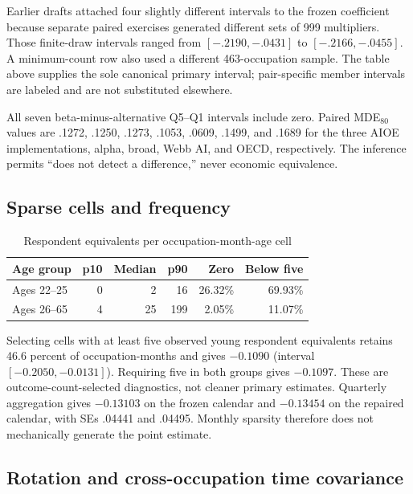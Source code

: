 Earlier drafts attached four slightly different intervals to the frozen coefficient because separate paired exercises generated different sets of 999 multipliers. Those finite-draw intervals ranged from $[-.2190,-.0431]$ to $[-.2166,-.0455]$. A minimum-count row also used a different 463-occupation sample. The table above supplies the sole canonical primary interval; pair-specific member intervals are labeled and are not substituted elsewhere.

All seven beta-minus-alternative Q5--Q1 intervals include zero. Paired MDE$_{80}$ values are .1272, .1250, .1273, .1053, .0609, .1499, and .1689 for the three AIOE implementations, alpha, broad, Webb AI, and OECD, respectively. The inference permits ``does not detect a difference,'' never economic equivalence.

\subsection{Sparse cells and frequency}

\begin{table}[htbp]
\centering
\caption{Respondent equivalents per occupation-month-age cell}\label{tab:appcells}
\small
\begin{tabular}{lrrrrr}
\toprule
Age group & p10 & Median & p90 & Zero & Below five \\
\midrule
Ages 22--25 & 0 & 2 & 16 & 26.32\% & 69.93\% \\
Ages 26--65 & 4 & 25 & 199 & 2.05\% & 11.07\% \\
\bottomrule
\end{tabular}
\end{table}

Selecting cells with at least five observed young respondent equivalents retains 46.6 percent of occupation-months and gives $-0.1090$ (interval $[-0.2050,-0.0131]$). Requiring five in both groups gives $-0.1097$. These are outcome-count-selected diagnostics, not cleaner primary estimates. Quarterly aggregation gives $-0.13103$ on the frozen calendar and $-0.13454$ on the repaired calendar, with SEs .04441 and .04495. Monthly sparsity therefore does not mechanically generate the point estimate.

\subsection{Rotation and cross-occupation time covariance}

